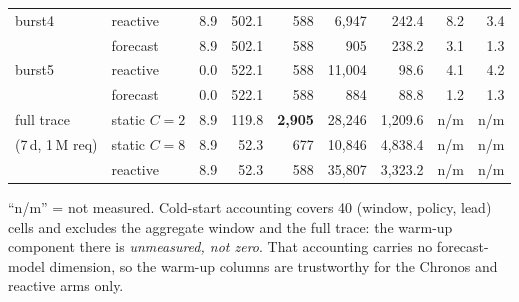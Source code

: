 \begin{table}[htbp]
\begin{tabular}{@{}llrrrrrrr@{}}
burst4 & reactive & 8.9 & 502.1 & 588 & 6{,}947 & 242.4 & 8.2 & 3.4 \\
       & forecast & 8.9 & 502.1 & 588 & 905 & 238.2 & 3.1 & 1.3 \\
burst5 & reactive & 0.0 & 522.1 & 588 & 11{,}004 & 98.6 & 4.1 & 4.2 \\
       & forecast & 0.0 & 522.1 & 588 & 884 & 88.8 & 1.2 & 1.3 \\
\midrule
full trace & static $C{=}2$ & 8.9 & 119.8 & \textbf{2{,}905} & 28{,}246 & 1{,}209.6 & n/m & n/m \\
(7\,d, 1\,M req) & static $C{=}8$ & 8.9 & 52.3 & 677 & 10{,}846 & 4{,}838.4 & n/m & n/m \\
           & reactive & 8.9 & 52.3 & 588 & 35{,}807 & 3{,}323.2 & n/m & n/m \\
\bottomrule
\end{tabular}

\vspace{2pt}
{\footnotesize ``n/m'' = not measured. Cold-start accounting covers 40 (window,
policy, lead) cells and excludes the aggregate window and the full trace: the
warm-up component there is \emph{unmeasured, not zero}. That accounting carries no
forecast-model dimension, so the warm-up columns are trustworthy for the
Chronos and reactive arms only.}
\end{table}

